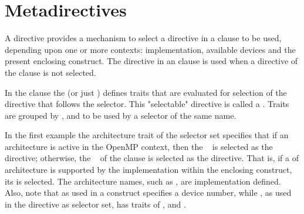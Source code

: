 \pagebreak
\section{Metadirectives}
\label{sec:metadirective}

A  directive provides a mechanism to select a directive in
a  clause to be used, depending upon one or more contexts:  
implementation, available devices and the present enclosing construct. 
The directive in an  clause is used when a directive of the 
 clause is not selected.

In the  clause the  (or just ) defines traits that are
evaluated for selection of the directive that follows the selector. 
This "selectable" directive is called a .
Traits are grouped by ,  and 
  to be used by a selector of the same name.

In the first example the architecture trait  of the 
 selector set specifies that if an  architecture is
active in the OpenMP context, then the ~ 
 is selected as the directive; otherwise, the ~
 of the  clause is selected as the directive.
That is, if a  of  architecture is supported by the implementation within
the enclosing  construct, its  is selected.
The architecture names, such as , are implementation defined.
Also, note that  as used in a  construct specifies
a device number, while , as used in the 
directive as selector set, has traits of ,  and .



